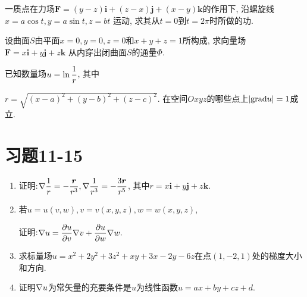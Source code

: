 \begin{yyEx}
	一质点在力场$\bm{F} = (y-z)\bm{i}+(z-x)\bm{j}+(x-y)\bm{k}$的作用下, 沿螺旋线$x = a\cos t,y = a\sin t, z = bt$ 运动, 求其从$t = 0$到$t = 2\pi$时所做的功.
\end{yyEx}

\begin{yyEx}
	设曲面$S$由平面$x = 0,y = 0,z = 0$和$x+y+z = 1$所构成, 求向量场$\bm{F} = x\bm{i}+y\bm{j}+z\bm{k}$ 从内穿出闭曲面$S$的通量$\varPhi$.
\end{yyEx}

\begin{yyEx}
	已知数量场$\begin{lgathered}
		u =\ln\frac{1}{r}
	\end{lgathered}$, 其中 
	
	$r = \sqrt{(x-a)^2 + (y-b)^2 + (z-c)^2}$. 在空间$Oxyz$的哪些点上$\lvert\mathrm{grad}u\rvert = 1$成立.
\end{yyEx}

\section{习题11-15}

\begin{yyEx}
	\begin{enumerate}
		\item 证明:$\begin{lgathered}
			\grad\frac{1}{r} = -\frac{\bm{r}}{r^3},\grad\frac{1}{r^3} = -\frac{3\bm{r}}{r^5}
		\end{lgathered}$, 其中$r = x\bm{i}+y\bm{j}+z\bm{k}$.
		\item 若$u = u(v,w), v = v(x,y,z), w = w(x,y,z)$,
		
		 证明:$\begin{lgathered}
			\grad u = \frac{\partial u}{\partial v}\grad v+\frac{\partial u}{\partial w}\grad w.
		\end{lgathered}$
		\item 求标量场$u = x^2+2y^2+3z^2+xy+3x-2y-6z$在点$(1,-2,1)$处的梯度大小和方向.
		\item 证明$\nabla u$为常矢量的充要条件是$u$为线性函数$u = ax+by+cz+d$.
	\end{enumerate}
\end{yyEx}

